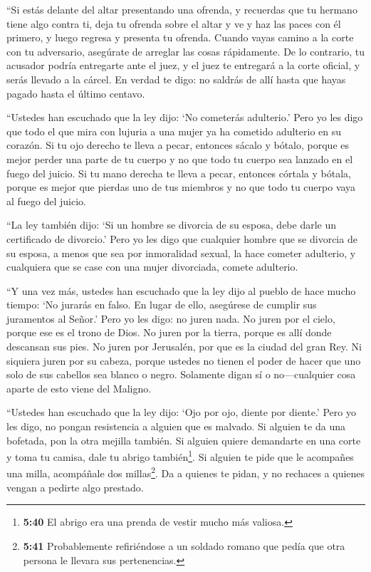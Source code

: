  ``Si estás delante del altar presentando una ofrenda, y
recuerdas que tu hermano tiene algo contra ti,  deja tu
ofrenda sobre el altar y ve y haz las paces con él primero, y luego
regresa y presenta tu ofrenda.  Cuando vayas camino a la
corte con tu adversario, asegúrate de arreglar las cosas rápidamente. De
lo contrario, tu acusador podría entregarte ante el juez, y el juez te
entregará a la corte oficial, y serás llevado a la cárcel. 
En verdad te digo: no saldrás de allí hasta que hayas pagado hasta el
último centavo.

 ``Ustedes han escuchado que la ley dijo: `No cometerás
adulterio.'  Pero yo les digo que todo el que mira con
lujuria a una mujer ya ha cometido adulterio en su corazón.
 Si tu ojo derecho te lleva a pecar, entonces sácalo y
bótalo, porque es mejor perder una parte de tu cuerpo y no que todo tu
cuerpo sea lanzado en el fuego del juicio.  Si tu mano
derecha te lleva a pecar, entonces córtala y bótala, porque es mejor que
pierdas uno de tus miembros y no que todo tu cuerpo vaya al fuego del
juicio.

 ``La ley también dijo: `Si un hombre se divorcia de su
esposa, debe darle un certificado de divorcio.'  Pero yo
les digo que cualquier hombre que se divorcia de su esposa, a menos que
sea por inmoralidad sexual, la hace cometer adulterio, y cualquiera que
se case con una mujer divorciada, comete adulterio.

 ``Y una vez más, ustedes han escuchado que la ley dijo al
pueblo de hace mucho tiempo: `No jurarás en falso. En lugar de ello,
asegúrese de cumplir sus juramentos al Señor.'  Pero yo les
digo: no juren nada. No juren por el cielo, porque ese es el trono de
Dios.  No juren por la tierra, porque es allí donde
descansan sus pies. No juren por Jerusalén, por que es la ciudad del
gran Rey.  Ni siquiera juren por su cabeza, porque ustedes
no tienen el poder de hacer que uno solo de sus cabellos sea blanco o
negro.  Solamente digan sí o no---cualquier cosa aparte de
esto viene del Maligno.

 ``Ustedes han escuchado que la ley dijo: `Ojo por ojo,
diente por diente.'  Pero yo les digo, no pongan
resistencia a alguien que es malvado. Si alguien te da una bofetada, pon
la otra mejilla también.  Si alguien quiere demandarte en
una corte y toma tu camisa, dale tu abrigo también\footnote{\textbf{5:40}
  El abrigo era una prenda de vestir mucho más valiosa.}. 
Si alguien te pide que le acompañes una milla, acompáñale dos
millas\footnote{\textbf{5:41} Probablemente refiriéndose a un soldado
  romano que pedía que otra persona le llevara sus pertenencias.}.
 Da a quienes te pidan, y no rechaces a quienes vengan a
pedirte algo prestado.

